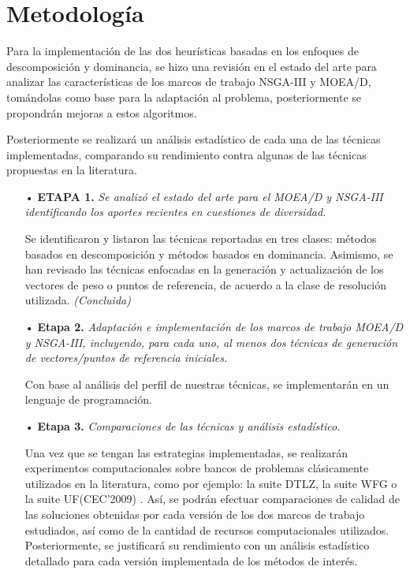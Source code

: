 \documentclass[letterpaper,10pt]{article}
\begin{document}
\section{Metodología}

Para la implementación de las dos heurísticas basadas en los enfoques de descomposición y dominancia, se hizo una revisión en el estado del arte para analizar las características de los marcos de trabajo NSGA-III y MOEA/D, tomándolas  como  base para la adaptación al problema, posteriormente se propondrán mejoras a estos algoritmos.
 
Posteriormente se realizará un análisis estadístico de cada una de las técnicas implementadas, comparando su rendimiento contra algunas de las  técnicas propuestas en la literatura.
 
 \begin{itemize}
 \item[•] \textbf{ETAPA 1.} \emph{Se analizó el estado del arte para el MOEA/D y NSGA-III identificando los aportes recientes en cuestiones de diversidad.}
\item[] Se identificaron y listaron las técnicas reportadas en tres clases: métodos basados en descomposición y métodos basados en dominancia. Asimismo, se han revisado las técnicas enfocadas en la generación y actualización de los vectores de peso o puntos de referencia, de acuerdo a la clase de resolución utilizada.
\emph{(Concluida)}

\item[•] \textbf{Etapa 2.} \emph{Adaptación e implementación de los marcos de trabajo MOEA/D y NSGA-III, incluyendo, para cada uno, al menos dos técnicas de generación de vectores/puntos de referencia iniciales.}

\item[] Con base al análisis del perfil de nuestras técnicas, se implementarán en un lenguaje de programación.
        
\item[•] \textbf{Etapa 3.} \emph{Comparaciones de las técnicas y análisis estadístico.}

\item [] Una vez que se tengan las estrategias implementadas, se realizarán experimentos computacionales sobre bancos de problemas clásicamente utilizados en la literatura, como por ejemplo: la suite DTLZ, la suite WFG o la suite UF(CEC'2009) \cite{coello2007evolutionary,zhang2008multiobjective}. Así, se podrán efectuar comparaciones de calidad de las soluciones obtenidas por cada versión de los dos marcos de trabajo estudiados, así como de la cantidad de recursos computacionales utilizados. Posteriormente, se justificará su rendimiento con un análisis estadístico detallado para cada versión implementada de los métodos de interés.


\end{itemize}
\end{document}
